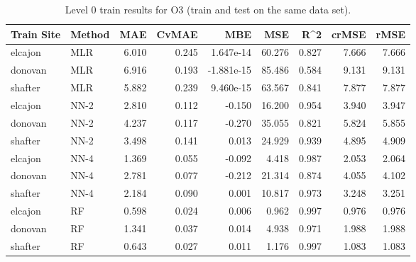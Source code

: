 \begin{table}[h]
\begin{tabular}{llrrrrrrr}
\toprule
 Train Site & Method &   MAE &  CvMAE &       MBE &     MSE &   R\textasciicircum2 &  crMSE &   rMSE \\
\midrule
elcajon & MLR & 6.010 & 0.245 & 1.647e-14 & 60.276 & 0.827 & 7.666 & 7.666\\
donovan & MLR & 6.916 & 0.193 & -1.881e-15 & 85.486 & 0.584 & 9.131 & 9.131\\
shafter & MLR & 5.882 & 0.239 & 9.460e-15 & 63.567 & 0.841 & 7.877 & 7.877\\
elcajon & NN-2 & 2.810 & 0.112 & -0.150 & 16.200 & 0.954 & 3.940 & 3.947\\
donovan & NN-2 & 4.237 & 0.117 & -0.270 & 35.055 & 0.821 & 5.824 & 5.855\\
shafter & NN-2 & 3.498 & 0.141 & 0.013 & 24.929 & 0.939 & 4.895 & 4.909\\
elcajon & NN-4 & 1.369 & 0.055 & -0.092 & 4.418 & 0.987 & 2.053 & 2.064\\
donovan & NN-4 & 2.781 & 0.077 & -0.212 & 21.314 & 0.874 & 4.055 & 4.102\\
shafter & NN-4 & 2.184 & 0.090 & 0.001 & 10.817 & 0.973 & 3.248 & 3.251\\
elcajon & RF & 0.598 & 0.024 & 0.006 & 0.962 & 0.997 & 0.976 & 0.976\\
donovan & RF & 1.341 & 0.037 & 0.014 & 4.938 & 0.971 & 1.988 & 1.988\\
shafter & RF & 0.643 & 0.027 & 0.011 & 1.176 & 0.997 & 1.083 & 1.083\\
\bottomrule
\end{tabular}
\caption{Level 0 train results for O3 (train and test on the same data set).}
\end{table}

